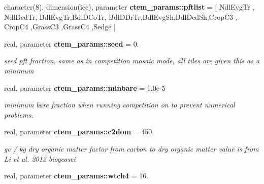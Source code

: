 \begin{DoxyCompactItemize}
\item 
\hypertarget{namespacectem__params_acbc2ae92278687bbfae38ba501904140}{}character(8), dimension(icc), parameter {\bfseries ctem\+\_\+params\+::pftlist} = \mbox{[} \textquotesingle{}Ndl\+Evg\+Tr\textquotesingle{} , \textquotesingle{}Ndl\+Dcd\+Tr\textquotesingle{}, \textquotesingle{}Bdl\+Evg\+Tr\textquotesingle{},\textquotesingle{}Bdl\+D\+Co\+Tr\textquotesingle{}, \textquotesingle{}Bdl\+D\+Dr\+Tr\textquotesingle{},\textquotesingle{}Bdl\+Evg\+Sh\textquotesingle{},\textquotesingle{}Bdl\+Dcd\+Sh\textquotesingle{},\textquotesingle{}Crop\+C3 \textquotesingle{}, \textquotesingle{}Crop\+C4 \textquotesingle{},\textquotesingle{}Grass\+C3 \textquotesingle{},\textquotesingle{}Grass\+C4 \textquotesingle{},\textquotesingle{}Sedge \textquotesingle{} \mbox{]}\label{namespacectem__params_acbc2ae92278687bbfae38ba501904140}

\item 
\hypertarget{namespacectem__params_ac9f4780ce317911fbf6daa45a90a8dad}{}real, parameter {\bfseries ctem\+\_\+params\+::seed} = 0.\label{namespacectem__params_ac9f4780ce317911fbf6daa45a90a8dad}

\begin{DoxyCompactList}\small\item\em seed pft fraction, same as in competition  mosaic mode, all tiles are given this as a minimum \end{DoxyCompactList}\item 
\hypertarget{namespacectem__params_a4e93696e56f999aa1005c61d4ed25789}{}real, parameter {\bfseries ctem\+\_\+params\+::minbare} = 1.\+0e-\/5\label{namespacectem__params_a4e93696e56f999aa1005c61d4ed25789}

\begin{DoxyCompactList}\small\item\em minimum bare fraction when running competition on to prevent numerical problems. \end{DoxyCompactList}\item 
\hypertarget{namespacectem__params_a6acddc90acef172ea5a361fd7e628696}{}real, parameter {\bfseries ctem\+\_\+params\+::c2dom} = 450.\label{namespacectem__params_a6acddc90acef172ea5a361fd7e628696}

\begin{DoxyCompactList}\small\item\em gc / kg dry organic matter  factor from carbon to dry organic matter value is from Li et al. 2012 biogeosci \end{DoxyCompactList}\item 
\hypertarget{namespacectem__params_a5246c472162b5b9f071d4e55d87ee84c}{}real, parameter {\bfseries ctem\+\_\+params\+::wtch4} = 16.\label{namespacectem__params_a5246c472162b5b9f071d4e55d87ee84c}


\end{DoxyCompactItemize}
